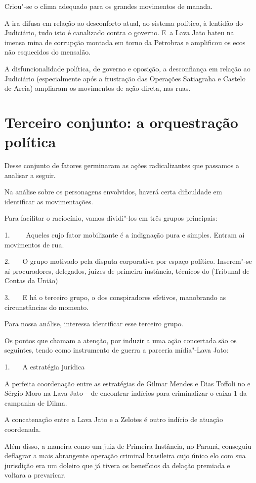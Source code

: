 Criou"-se o clima adequado para os grandes movimentos de manada.

A ira difusa em relação ao desconforto atual, ao sistema político, à
lentidão do Judiciário, tudo isto é canalizado contra o governo. E~a
Lava Jato bateu na imensa mina de corrupção montada em torno da
Petrobras e amplificou os ecos não esquecidos do mensalão.

A disfuncionalidade política, de governo e oposição, a desconfiança em
relação ao Judiciário (especialmente após a frustração das Operações
Satiagraha e Castelo de Areia) ampliaram os movimentos de ação direta,
nas ruas.

\section{Terceiro conjunto: a orquestração política}

Desse conjunto de fatores germinaram as ações radicalizantes que
passamos a analisar a seguir.

Na análise sobre os personagens envolvidos, haverá certa dificuldade em
identificar as movimentações.

Para facilitar o raciocínio, vamos dividi"-los em três grupos principais:

1.~~~ ~Aqueles cujo fator mobilizante é a indignação pura e simples.
Entram aí movimentos de rua.

2.~~~ O grupo motivado pela disputa corporativa por espaço político.
Inserem"-se aí procuradores, delegados, juízes de primeira instância,
técnicos do  (Tribunal de Contas da União)

3.~~~ E há o terceiro grupo, o dos conspiradores efetivos, manobrando as
circunstâncias do momento.

Para nossa análise, interessa identificar esse terceiro grupo.

Os pontos que chamam a atenção, por induzir a uma ação concertada são os
seguintes, tendo como instrumento de guerra a parceria mídia"-Lava Jato:

1.~~~ A estratégia jurídica

A perfeita coordenação entre as estratégias de Gilmar Mendes e Dias
Toffoli no  e Sérgio Moro na Lava Jato -- de encontrar indícios para
criminalizar o caixa 1 da campanha de Dilma.

A concatenação entre a Lava Jato e a Zelotes é outro indício de atuação
coordenada.

Além disso, a maneira como um juiz de Primeira Instância, no Paraná,
conseguiu deflagrar a mais abrangente operação criminal brasileira cujo
único elo com sua jurisdição era um doleiro que já tivera os benefícios
da delação premiada e voltara a prevaricar.

